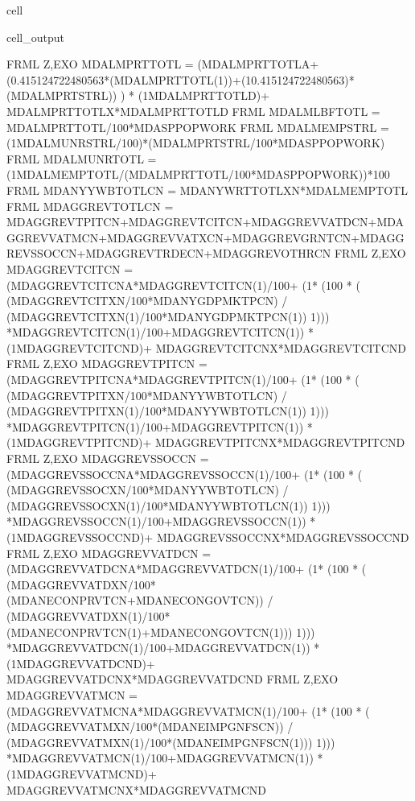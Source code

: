 \documentclass[letterpaper,10pt,english]{jupyterBook}
\begin{document}
\begin{sphinxuseclass}{cell}
\begin{sphinxVerbatimOutput}
\begin{sphinxuseclass}{cell_output}
\begin{sphinxVerbatim}[commandchars=\\\{\}]
FRML \PYGZlt{}Z,EXO\PYGZgt{} MDALMPRTTOTL\PYGZus{} = (MDALMPRTTOTL\PYGZus{}\PYGZus{}A+ (0.415124722480563*(MDALMPRTTOTL\PYGZus{}(\PYGZhy{}1))+(1\PYGZhy{}0.415124722480563)*(MDALMPRTSTRL\PYGZus{})) ) * (1\PYGZhy{}MDALMPRTTOTL\PYGZus{}\PYGZus{}D)+ MDALMPRTTOTL\PYGZus{}\PYGZus{}X*MDALMPRTTOTL\PYGZus{}\PYGZus{}D  \PYGZdl{}
FRML  \PYGZlt{}\PYGZgt{} MDALMLBFTOTL = MDALMPRTTOTL\PYGZus{}/100*MDASPPOPWORK \PYGZdl{}
FRML  \PYGZlt{}\PYGZgt{} MDALMEMPSTRL = (1\PYGZhy{}MDALMUNRSTRL\PYGZus{}/100)*(MDALMPRTSTRL\PYGZus{}/100*MDASPPOPWORK) \PYGZdl{}
FRML  \PYGZlt{}\PYGZgt{} MDALMUNRTOTL\PYGZus{} = (1\PYGZhy{}MDALMEMPTOTL/(MDALMPRTTOTL\PYGZus{}/100*MDASPPOPWORK))*100 \PYGZdl{}
FRML  \PYGZlt{}\PYGZgt{} MDANYYWBTOTLCN = MDANYWRTTOTLXN*MDALMEMPTOTL \PYGZdl{}
FRML  \PYGZlt{}\PYGZgt{} MDAGGREVTOTLCN = MDAGGREVTPITCN+MDAGGREVTCITCN+MDAGGREVVATDCN+MDAGGREVVATMCN+MDAGGREVVATXCN+MDAGGREVGRNTCN+MDAGGREVSSOCCN+MDAGGREVTRDECN+MDAGGREVOTHRCN \PYGZdl{}
FRML \PYGZlt{}Z,EXO\PYGZgt{} MDAGGREVTCITCN = (MDAGGREVTCITCN\PYGZus{}A*MDAGGREVTCITCN(\PYGZhy{}1)/100+ (1* (100 * ( (MDAGGREVTCITXN/100*MDANYGDPMKTPCN) / (MDAGGREVTCITXN(\PYGZhy{}1)/100*MDANYGDPMKTPCN(\PYGZhy{}1)) \PYGZhy{}1))) *MDAGGREVTCITCN(\PYGZhy{}1)/100+MDAGGREVTCITCN(\PYGZhy{}1)) * (1\PYGZhy{}MDAGGREVTCITCN\PYGZus{}D)+ MDAGGREVTCITCN\PYGZus{}X*MDAGGREVTCITCN\PYGZus{}D  \PYGZdl{}
FRML \PYGZlt{}Z,EXO\PYGZgt{} MDAGGREVTPITCN = (MDAGGREVTPITCN\PYGZus{}A*MDAGGREVTPITCN(\PYGZhy{}1)/100+ (1* (100 * ( (MDAGGREVTPITXN/100*MDANYYWBTOTLCN) / (MDAGGREVTPITXN(\PYGZhy{}1)/100*MDANYYWBTOTLCN(\PYGZhy{}1)) \PYGZhy{}1))) *MDAGGREVTPITCN(\PYGZhy{}1)/100+MDAGGREVTPITCN(\PYGZhy{}1)) * (1\PYGZhy{}MDAGGREVTPITCN\PYGZus{}D)+ MDAGGREVTPITCN\PYGZus{}X*MDAGGREVTPITCN\PYGZus{}D  \PYGZdl{}
FRML \PYGZlt{}Z,EXO\PYGZgt{} MDAGGREVSSOCCN = (MDAGGREVSSOCCN\PYGZus{}A*MDAGGREVSSOCCN(\PYGZhy{}1)/100+ (1* (100 * ( (MDAGGREVSSOCXN/100*MDANYYWBTOTLCN) / (MDAGGREVSSOCXN(\PYGZhy{}1)/100*MDANYYWBTOTLCN(\PYGZhy{}1)) \PYGZhy{}1))) *MDAGGREVSSOCCN(\PYGZhy{}1)/100+MDAGGREVSSOCCN(\PYGZhy{}1)) * (1\PYGZhy{}MDAGGREVSSOCCN\PYGZus{}D)+ MDAGGREVSSOCCN\PYGZus{}X*MDAGGREVSSOCCN\PYGZus{}D  \PYGZdl{}
FRML \PYGZlt{}Z,EXO\PYGZgt{} MDAGGREVVATDCN = (MDAGGREVVATDCN\PYGZus{}A*MDAGGREVVATDCN(\PYGZhy{}1)/100+ (1* (100 * ( (MDAGGREVVATDXN/100*(MDANECONPRVTCN+MDANECONGOVTCN)) / (MDAGGREVVATDXN(\PYGZhy{}1)/100*(MDANECONPRVTCN(\PYGZhy{}1)+MDANECONGOVTCN(\PYGZhy{}1))) \PYGZhy{}1))) *MDAGGREVVATDCN(\PYGZhy{}1)/100+MDAGGREVVATDCN(\PYGZhy{}1)) * (1\PYGZhy{}MDAGGREVVATDCN\PYGZus{}D)+ MDAGGREVVATDCN\PYGZus{}X*MDAGGREVVATDCN\PYGZus{}D  \PYGZdl{}
FRML \PYGZlt{}Z,EXO\PYGZgt{} MDAGGREVVATMCN = (MDAGGREVVATMCN\PYGZus{}A*MDAGGREVVATMCN(\PYGZhy{}1)/100+ (1* (100 * ( (MDAGGREVVATMXN/100*(MDANEIMPGNFSCN)) / (MDAGGREVVATMXN(\PYGZhy{}1)/100*(MDANEIMPGNFSCN(\PYGZhy{}1))) \PYGZhy{}1))) *MDAGGREVVATMCN(\PYGZhy{}1)/100+MDAGGREVVATMCN(\PYGZhy{}1)) * (1\PYGZhy{}MDAGGREVVATMCN\PYGZus{}D)+ MDAGGREVVATMCN\PYGZus{}X*MDAGGREVVATMCN\PYGZus{}D  \PYGZdl{}

\end{sphinxVerbatim}
\end{sphinxuseclass}
\end{sphinxVerbatimOutput}
\end{sphinxuseclass}
\end{document}
